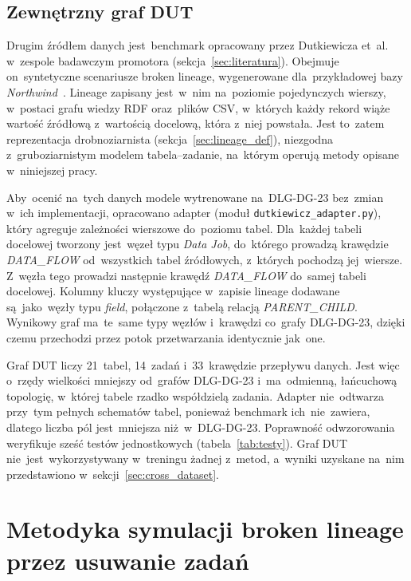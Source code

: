 \subsection{Zewnętrzny graf DUT}
\label{sec:dane-dut}

Drugim źródłem danych jest~benchmark opracowany przez Dutkiewicza
et~al.~\cite{Dutkiewicz2026} w~zespole badawczym promotora
(sekcja~\ref{sec:literatura}). Obejmuje on~syntetyczne scenariusze broken
lineage, wygenerowane dla~przykładowej bazy \emph{Northwind}~\cite{Northwind}.
Lineage zapisany jest~w~nim na~poziomie pojedynczych wierszy, w~postaci grafu
wiedzy RDF oraz~plików CSV, w~których każdy rekord wiąże wartość źródłową
z~wartością docelową, która z~niej powstała. Jest to~zatem reprezentacja
drobnoziarnista (sekcja~\ref{sec:lineage_def}), niezgodna z~gruboziarnistym
modelem tabela–zadanie, na~którym operują metody opisane w~niniejszej pracy.

Aby~ocenić na~tych danych modele wytrenowane na~DLG-DG-23 bez~zmian w~ich
implementacji, opracowano adapter (moduł \texttt{dutkiewicz\_adapter.py}),
który agreguje zależności wierszowe do~poziomu tabel. Dla~każdej tabeli
docelowej tworzony jest~węzeł typu \emph{Data Job}, do~którego prowadzą
krawędzie \emph{DATA\_FLOW} od~wszystkich tabel źródłowych, z~których
pochodzą jej~wiersze. Z~węzła tego prowadzi następnie krawędź \emph{DATA\_FLOW}
do~samej tabeli docelowej. Kolumny kluczy występujące w~zapisie lineage
dodawane są~jako~węzły typu \emph{field}, połączone z~tabelą relacją
\emph{PARENT\_CHILD}. Wynikowy graf ma~te~same typy węzłów i~krawędzi
co~grafy DLG-DG-23, dzięki czemu przechodzi przez potok przetwarzania
identycznie jak~one.

Graf DUT liczy 21~tabel, 14~zadań i~33~krawędzie przepływu danych. Jest więc
o~rzędy wielkości mniejszy od~grafów DLG-DG-23 i~ma~odmienną, łańcuchową
topologię, w~której tabele rzadko współdzielą zadania. Adapter nie~odtwarza
przy~tym pełnych schematów tabel, ponieważ benchmark ich~nie~zawiera,
dlatego liczba pól jest~mniejsza niż~w~DLG-DG-23. Poprawność odwzorowania
weryfikuje sześć testów jednostkowych (tabela~\ref{tab:testy}). Graf DUT
nie~jest~wykorzystywany w~treningu żadnej z~metod, a~wyniki uzyskane na~nim
przedstawiono w~sekcji~\ref{sec:cross_dataset}.

\section{Metodyka symulacji broken lineage przez usuwanie zadań}
\label{sec:symulacja}

